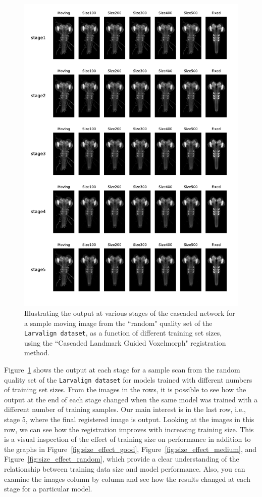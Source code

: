 \documentclass{book}
\begin{document}
	\begin{figure}[h!]
		\centering
		\includegraphics[width=\columnwidth]{resources/ablation_size/stage_vs_size_random.pdf}
		\caption{Illustrating the output at various stages of the cascaded network for a sample moving image from the ``random" quality set of the \texttt{Larvalign dataset}, as a function of different training set sizes, using the ``Cascaded Landmark Guided Voxelmorph" registration method.}
		\label{fig:stage_vs_size_random}
	\end{figure}
	
	Figure~\ref{fig:stage_vs_size_random} shows the output at each stage for a sample scan from the random quality set of the \texttt{Larvalign dataset} for models trained with different numbers of training set sizes. From the images in the rows, it is possible to see how the output at the end of each stage changed when the same model was trained with a different number of training samples. Our main interest is in the last row, i.e., stage 5, where the final registered image is output. Looking at the images in this row, we can see how the registration improves with increasing training size. This is a visual inspection of the effect of training size on performance in addition to the graphs in Figure~\ref{fig:size_effect_good}, Figure~\ref{fig:size_effect_medium}, and Figure~\ref{fig:size_effect_random}, which provide a clear understanding of the relationship between training data size and model performance. Also, you can examine the images column by column and see how the results changed at each stage for a particular model.
	
\end{document}
